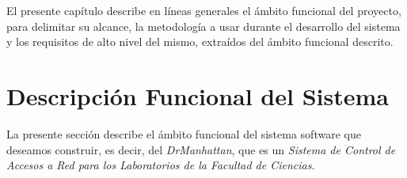 ﻿%


\label{chap:planificacion}


El presente cap\'itulo describe en líneas generales el ámbito funcional del proyecto, para delimitar su alcance, la metodología a usar durante el desarrollo del sistema y los requisitos de alto nivel del mismo, extraídos del ámbito funcional descrito.


\chaptertoc

\section{Descripción Funcional del Sistema}
\label{sec:planificacion:descFuncional}

La presente sección describe el ámbito funcional del sistema software que deseamos construir, es decir, del \emph{DrManhattan}, que es un \emph{Sistema de Control de Accesos a Red para los Laboratorios de la Facultad de Ciencias}.\newline


